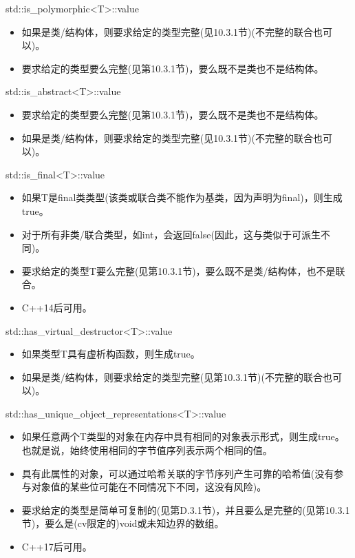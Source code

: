 std::is\_polymorphic<T>::value

\begin{itemize}
\item 
如果是类/结构体，则要求给定的类型完整(见10.3.1节)(不完整的联合也可以)。

\item 
要求给定的类型要么完整(见第10.3.1节)，要么既不是类也不是结构体。
\end{itemize}


std::is\_abstract<T>::value

\begin{itemize}
\item 
要求给定的类型要么完整(见第10.3.1节)，要么既不是类也不是结构体。

\item 
如果是类/结构体，则要求给定的类型完整(见10.3.1节)(不完整的联合也可以)。
\end{itemize}

std::is\_final<T>::value

\begin{itemize}
\item 
如果T是final类类型(该类或联合类不能作为基类，因为声明为final)，则生成true。

\item 
对于所有非类/联合类型，如int，会返回false(因此，这与类似于可派生不同)。

\item 
要求给定的类型T要么完整(见第10.3.1节)，要么既不是类/结构体，也不是联合。

\item 
C++14后可用。
\end{itemize}

std::has\_virtual\_destructor<T>::value

\begin{itemize}
\item 
如果类型T具有虚析构函数，则生成true。

\item 
如果是类/结构体，则要求给定的类型完整(见第10.3.1节)(不完整的联合也可以)。
\end{itemize}

std::has\_unique\_object\_representations<T>::value

\begin{itemize}
\item 
如果任意两个T类型的对象在内存中具有相同的对象表示形式，则生成true。也就是说，始终使用相同的字节值序列表示两个相同的值。

\item 
具有此属性的对象，可以通过哈希关联的字节序列产生可靠的哈希值(没有参与对象值的某些位可能在不同情况下不同，这没有风险)。

\item 
要求给定的类型是简单可复制的(见第D.3.1节)，并且要么是完整的(见第10.3.1节)，要么是(cv限定的)void或未知边界的数组。

\item 
C++17后可用。
\end{itemize}

